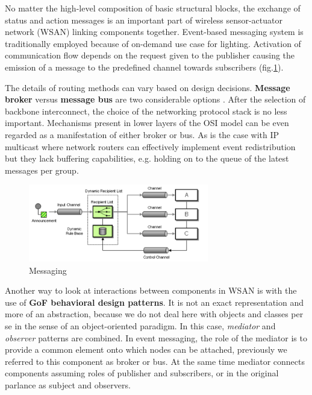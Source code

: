 \documentclass[11pt, english, a4paper, twoside]{article}
\begin{document}
No matter the high-level composition of basic structural blocks, the exchange of status and action messages is an important part of wireless sensor-actuator network (WSAN) linking components together. Event-based messaging system is traditionally employed because of on-demand use case for lighting. Activation of communication flow depends on the request given to the publisher causing the emission of a message to the predefined channel towards subscribers (fig.\ref{fig:event-messaging}). 

The details of routing methods can vary based on design decisions. \textbf{Message broker} versus \textbf{message bus} are two considerable options \cite{cristea_distributed_2011}. After the selection of backbone interconnect, the choice of the networking protocol stack is no less important. Mechanisms present in lower layers of the OSI model can be even regarded as a manifestation of either broker or bus. As is the case with IP multicast where network routers can effectively implement event redistribution but they lack buffering capabilities, e.g. holding on to the queue of the latest messages per group. 

\begin{figure}
	\centering
	\includegraphics[width=0.7\textwidth]{messaging.png}
	\caption{Messaging \cite{cristea_distributed_2011}}
	\label{fig:event-messaging}
\end{figure}

Another way to look at interactions between components in WSAN is with the use of \textbf{GoF behavioral design patterns}. It is not an exact representation and more of an abstraction, because we do not deal here with objects and classes per se in the sense of an object-oriented paradigm. In this case, \emph{mediator} and \emph{observer} patterns are combined. In event messaging, the role of the mediator is to provide a common element onto which nodes can be attached, previously we referred to this component as broker or bus. At the same time mediator connects components assuming roles of publisher and subscribers, or in the original parlance as subject and observers.
\end{document}
